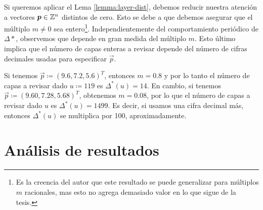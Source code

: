 Si queremos aplicar el Lema \ref{lemma:layer-dist}, debemos reducir nuestra atención a vectores
$\boldsymbol{p} \in \mathbb{Z}^n$ distintos de cero. Esto se debe a que debemos asegurar que el múltiplo $m \neq 0$
sea entero\footnote{Es la creencia del autor que este resultado se puede generalizar para múltiplos
$m$ racionales, mas esto no agrega demasiado valor en lo que sigue de la tesis.}. Independientemente
del comportamiento periódico de $\Delta*$, observemos que depende en gran medida del múltiplo $m$.
Esto último implica que el número de capas enteras a revisar depende del número de cifras decimales
usadas para especificar $\vec{p}$.

\begin{example}
	Si tenemos $\vec{p} \coloneq (9.6, 7.2, 5.6)^T$, entonces $m = 0.8$ y por lo tanto el número de
	capas a revisar dado $u \coloneq 119$ es $\Delta^*(u) = 14$. En cambio, si tenemos $\vec{p} \coloneq
	(9.60, 7.28, 5.68)^T$, obtenemos $m = 0.08$, por lo que el número de capas a revisar dado $u$ es
	$\Delta^*(u) = 1499$. Es decir, si usamos una cifra decimal más, entonces $\Delta^*(u)$ se
	multiplica por 100, aproximadamente.
\end{example}


\section{Análisis de resultados}
